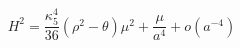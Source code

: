 \begin{equation}
H^2=\frac{\kappa_5^4}{36}(\rho^2-\theta)\mu^2 +\frac{\mu}{a^4}+ o(a^{-4})
\end{equation}

